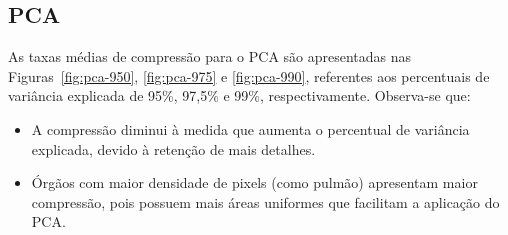 \subsection{\acrshort{PCA}}

As taxas médias de compressão para o \acrshort{PCA} são apresentadas nas Figuras~\ref{fig:pca-950}, \ref{fig:pca-975} e \ref{fig:pca-990}, referentes aos percentuais de variância explicada de 95\%, 97,5\% e 99\%, respectivamente. Observa-se que:

\begin{itemize}
    \item A compressão diminui à medida que aumenta o percentual de variância explicada, devido à retenção de mais detalhes.
    \item Órgãos com maior densidade de pixels (como pulmão) apresentam maior compressão, pois possuem mais áreas uniformes que facilitam a aplicação do \acrshort{PCA}.
\end{itemize}

\begin{figure}[H]
	\centering
\end{figure}

\begin{figure}[H]
	\centering
\end{figure}

